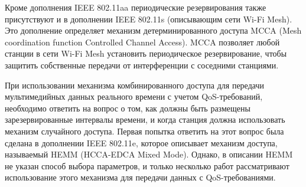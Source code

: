 Кроме дополнения IEEE 802.11aa периодические резервирования также присутствуют и в дополнении IEEE 802.11s (описывающим сети Wi-Fi Mesh). Это дополнение определяет механизм детерминированного доступа MCCA (Mesh coordination function Controlled Channel Access). MCCA позволяет любой станции в сети Wi-Fi Mesh установить периодическое резервирование, чтобы защитить собственные передачи от интерференции с соседними станциями. 

При использовании механизма комбинированного доступа для передачи мультимедийных данных реального времени с учетом QoS-требований, необходимо ответить на вопрос о том, как должны быть размещены зарезервированные интервалы времени, и когда станция должна использовать механизм случайного доступа. Первая попытка ответить на этот вопрос была сделана в дополнении  IEEE 802.11e, которое описывает механизм доступа, называемый HEMM (HCCA-EDCA Mixed Mode). Однако, в описании HEMM не указан способ выбора параметров, и только несколько работ  \cite{kuan2007utilization, lai2009adaptation, Ng2012, ruscelli2012enhancement} рассматривают использование этого механизма для передачи данных с QoS-требованиями.